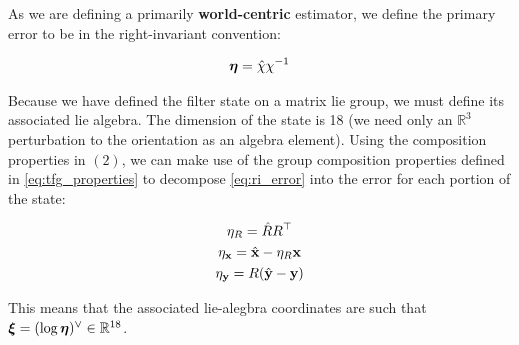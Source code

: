As we are defining a primarily \textbf{world-centric} estimator, we define the primary error to be in the right-invariant convention:

\begin{equation}
  \boldsymbol{\eta} = \hat{\chi}\chi^{-1}
  \label{eq:ri_error}
\end{equation}

Because we have defined the filter state on a matrix lie group, we must define its associated lie algebra. The dimension of the state is 18 (we need only an $\mathbb{R}^3$ perturbation to the orientation as an algebra element). Using the composition properties in $(2)$, we can make use of the group composition properties defined in \eqref{eq:tfg_properties} to decompose \eqref{eq:ri_error} into the error for each portion of the state:

\begin{equation}
  \begin{gathered} 
    \eta_R = \hat{R}R^\top \\
    \eta_{\mathbf{x}} =\hat{\mathbf{x}}-\eta_R\mathbf{x} \\
    \eta_{\mathbf{y}} = R(\hat{\mathbf{y}}-\mathbf{y})
  \end{gathered} 
  \label{eq:error_dynamics}
\end{equation}

This means that the associated lie-alegbra coordinates are such that $\boldsymbol{\xi} = (\log \boldsymbol{\eta})^\vee  \in \mathbb{R}^{18}$. 
